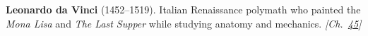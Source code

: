 \textbf{Leonardo da Vinci} (1452–1519). Italian Renaissance polymath who painted the \emph{Mona Lisa} and \emph{The Last Supper} while studying anatomy and mechanics. \emph{[Ch.~\hyperref[ch:maxwelldemon]{45}]}

